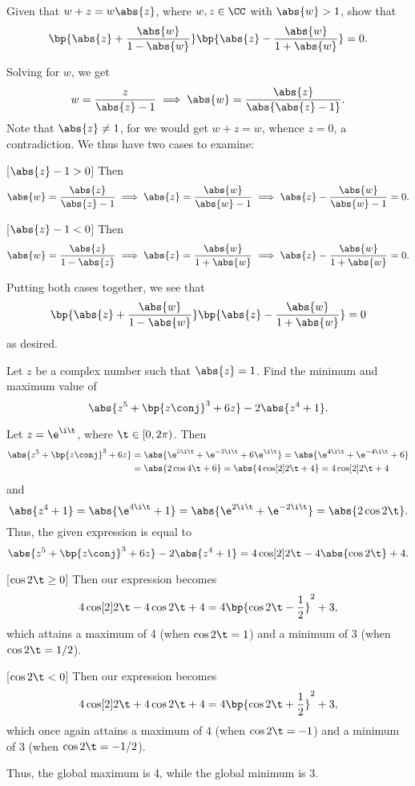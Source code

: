 \begin{problem}
    Given that $w + z = w\abs{z}$, where $w, z \in \CC$ with $\abs{w} > 1$, show that \[\bp{\abs{z} + \frac{\abs{w}}{1 - \abs{w}}}\bp{\abs{z} - \frac{\abs{w}}{1 + \abs{w}}} = 0.\]
\end{problem}
\begin{solution}
    Solving for $w$, we get \[w = \frac{z}{\abs{z} - 1} \implies \abs{w} = \frac{\abs{z}}{\abs{\abs{z} - 1}}.\] Note that $\abs{z} \neq 1$, for we would get $w + z = w$, whence $z = 0$, a contradiction. We thus have two cases to examine:

    [$\abs{z} - 1 > 0$] Then \[\abs{w} = \frac{\abs{z}}{\abs{z} - 1} \implies \abs{z} = \frac{\abs{w}}{\abs{w} - 1} \implies \abs{z} - \frac{\abs{w}}{\abs{w} - 1} = 0.\]

    [$\abs{z} - 1 < 0$] Then \[\abs{w} = \frac{\abs{z}}{1 - \abs{z}} \implies \abs{z} = \frac{\abs{w}}{1 + \abs{w}} \implies \abs{z} - \frac{\abs{w}}{1 + \abs{w}} = 0.\]

    Putting both cases together, we see that \[\bp{\abs{z} + \frac{\abs{w}}{1 - \abs{w}}}\bp{\abs{z} - \frac{\abs{w}}{1 + \abs{w}}} = 0\] as desired.
\end{solution}

\begin{problem}
    Let $z$ be a complex number such that $\abs{z} = 1$. Find the minimum and maximum value of \[\abs{z^5 + \bp{z\conj}^3 + 6z} - 2\abs{z^4 + 1}.\]
\end{problem}
\begin{solution}
    Let $z = \e^{\i \t}$, where $\t \in [0, 2\pi)$. Then
    \begin{align*}
        \abs{z^5 + \bp{z\conj}^3 + 6z} &= \abs{\e^{5 \i \t} + \e^{-3 \i \t} + 6\e^{\i \t}} = \abs{\e^{4\i \t} + \e^{-4\i \t} + 6}\\
        &= \abs{2\cos{4\t} + 6} = \abs{4\cos[2]{2\t} + 4} = 4\cos[2]{2\t} + 4
    \end{align*}
    and \[\abs{z^4 + 1} = \abs{\e^{4\i \t} + 1} = \abs{\e^{2\i\t} + \e^{-2\i\t}} = \abs{2\cos{2\t}}.\] Thus, the given expression is equal to \[\abs{z^5 + \bp{z\conj}^3 + 6z} - 2\abs{z^4 + 1} = 4\cos[2]{2\t} - 4\abs{\cos{2\t}} + 4.\]

    [$\cos{2\t} \geq 0$] Then our expression becomes \[4\cos[2]{2\t} - 4\cos{2\t} + 4 = 4\bp{\cos{2\t} - \frac12}^2 + 3,\] which attains a maximum of 4 (when $\cos{2\t} = 1$) and a minimum of 3 (when $\cos{2\t} = 1/2$).

    [$\cos{2\t} < 0$] Then our expression becomes \[4\cos[2]{2\t} + 4\cos{2\t} + 4 = 4\bp{\cos{2\t} + \frac12}^2 + 3,\] which once again attains a maximum of 4 (when $\cos{2\t} = -1$) and a minimum of 3 (when $\cos{2\t} = -1/2$).

    Thus, the global maximum is 4, while the global minimum is 3.
\end{solution}

